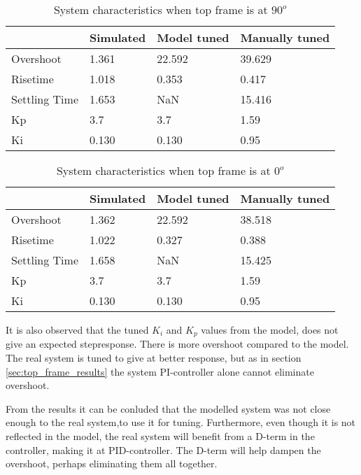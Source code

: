 \documentclass[../../Main]{subfiles}
\begin{document}
\begin{table}[H]
	\centering
	\begin{tabular}{l|*{3}{l}}
		&Simulated&Model tuned&Manually tuned\\
		\hline
		Overshoot&1.361&22.592&39.629\\
		Risetime& 1.018&0.353&0.417\\
		Settling Time& 1.653&NaN& 15.416\\
		Kp&3.7&3.7&1.59\\
		Ki&0.130&0.130&0.95
	\end{tabular}
	\caption{System characteristics when top frame is at $90^o$}
	\label{tab:90_bot}
\end{table}

\begin{table}[H]
	\centering
	\begin{tabular}{l|*{3}{l}}
		&Simulated&Model tuned&Manually tuned\\
		\hline
		Overshoot&1.362&22.592&38.518\\
		Risetime&1.022&0.327&0.388\\
		Settling Time&1.658&NaN&15.425\\
		Kp&3.7&3.7&1.59\\
		Ki&0.130&0.130&0.95
	\end{tabular}
	\caption{System characteristics when top frame is at $0^o$}
	\label{tab:0_bot}
\end{table}

It is also observed that the tuned $K_i$ and $K_p$ values from the model, does not give an expected stepresponse. There is more overshoot compared to the model. The real system is tuned to give at better response, but as in section \ref{sec:top_frame_results} the system PI-controller alone cannot eliminate overshoot.

From the results it can be conluded that the modelled system was not close enough to the real system,to use it for tuning. Furthermore, even though it is not reflected in the model, the real system will benefit from a D-term in the controller, making it at PID-controller. The D-term will help dampen the overshoot, perhaps eliminating them all together. 
\end{document}
